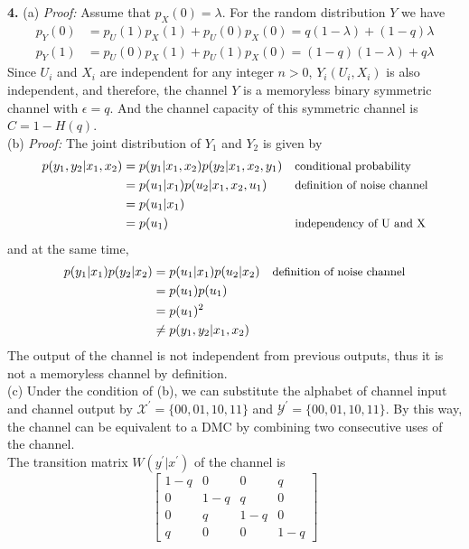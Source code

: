 \documentclass[12pt]{article}
\begin{document}
	\textbf{4.} (a) \textit{Proof:} Assume that $p_X(0) = \lambda$. For the random distribution $Y$ we have
	\begin{align*}
		p_Y(0) &= p_U(1)p_X(1) + p_U(0)p_X(0) = q(1-\lambda) + (1-q)\lambda\\
		p_Y(1) &= p_U(0)p_X(1) + p_U(1)p_X(0) = (1-q)(1-\lambda) + q\lambda
	\end{align*}
	Since $U_i$ and $X_i$ are independent for any integer $n>0$, $Y_i(U_i, X_i)$ is also independent, and therefore, the channel $Y$ is a memoryless binary symmetric channel with  $\epsilon = q$. And the channel capacity of this symmetric channel is $C = 1-H(q)$.
	\\
	(b) \textit{Proof:} The joint distribution of $Y_1$ and $ Y_2 $ is given by
	\begin{align*}
		p(y_1, y_2|x_1, x_2) &= p(y_1|x_1,x_2) p(y_2|x_1,x_2,y_1) && \text{\small{conditional probability}} \\
							 &= p(u_1|x_1)p(u_2|x_1, x_2, u_1)	  && \text{\small{definition of noise channel}} \\	
							 &= p(u_1|x_1) 	\\
							 &= p(u_1)							  && \text{\small{independency of U and X}}
	\end{align*}
	and at the same time,
	\begin{align*}
		p(y_1|x_1)p(y_2|x_2) &= p(u_1|x_1)p(u_2|x_2) 	&& \text{\small{definition of noise channel}}\\
							 &= p(u_1)p(u_1) \\
							 &= p(u_1)^2	 \\
							 &\not= p(y_1, y_2|x_1, x_2)
	\end{align*}
	The output of the channel is not independent from previous outputs, thus it is not a memoryless channel by definition.\\
	(c) Under the condition of (b), we can substitute the alphabet of channel input and channel output by $ \mathcal{X}^\prime = \{00, 01, 10, 11\} $ and $\mathcal{Y}^\prime = \{00, 01, 10, 11\}$. By this way, the channel can be equivalent to a DMC by combining two consecutive uses of the channel.\\
	The transition matrix $W(y^\prime|x^\prime)$ of the channel is 
	$$
	\begin{bmatrix}
	1-q & 0 	& 0   & q 		\\
	0 	& 1-q 	& q   & 0 		\\
	0 	& q 	& 1-q & 0 		\\
	q 	& 0	 	& 0	  & 1-q 
	\end{bmatrix}  
	$$
\end{document}
